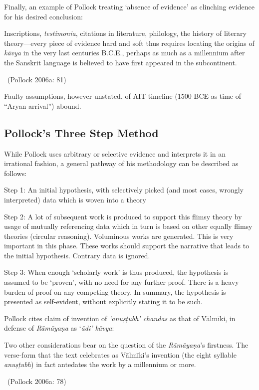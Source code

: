 Finally, an example of Pollock treating ‘absence of evidence’ as clinching evidence for his desired conclusion:

\begin{myquote}
Inscriptions, \textit{testimonia}, citations in literature, philology, the history of literary theory—every piece of evidence hard and soft thus requires locating the origins of \textit{kāvya} in the very last centuries B.C.E., perhaps as much as a millennium after the Sanskrit language is believed to have ﬁrst appeared in the subcontinent. 

~\hfill (Pollock 2006a: 81)
\end{myquote}

Faulty assumptions, however unstated, of AIT timeline (1500 BCE as time of “Aryan arrival”) abound.


\subsection*{Pollock’s Three Step Method}

While Pollock uses arbitrary or selective evidence and interprets it in an irrational fashion, a general pathway of his methodology can be described as follows:

Step 1: An initial hypothesis, with selectively picked (and most cases, wrongly interpreted) data which is woven into a theory

Step 2: A lot of subsequent work is produced to support this flimsy theory by usage of mutually referencing data which in turn is based on other equally flimsy theories (circular reasoning). Voluminous works are generated. This is very important in this phase. These works should support the narrative that leads to the initial hypothesis. Contrary data is ignored.

Step 3: When enough ‘scholarly work’ is thus produced, the hypothesis is assumed to be ‘proven’, with no need for any further proof. There is a heavy burden of proof on any competing theory. In summary, the hypothesis is presented as self-evident, without explicitly stating it to be such.

Pollock cites claim of invention of \textit{‘anuṣṭubh’ chandas} as that of Vālmīki, in defense of \textit{Rāmāyaṇa} as ‘\textit{ādi’ kāvya}:

\begin{myquote}
Two other considerations bear on the question of the \textit{Rāmāyaṇa}’s ﬁrstness. The verse-form that the text celebrates as Vālmīki’s invention (the eight syllable \textit{anuṣṭubh}) in fact antedates the work by a millennium or more. 

~\hfill (Pollock 2006a: 78)
\end{myquote}

